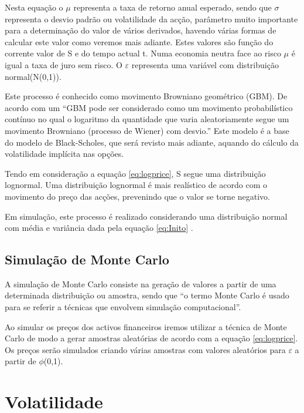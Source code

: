 \documentclass[
  12pt,
  a4paper,
  openany]{book}
\begin{document}
Nesta equação o \(\mu\) representa a taxa de retorno anual esperado, sendo que \(\sigma\) representa o desvio padrão ou volatilidade da acção, parâmetro muito importante para a determinação do valor de vários derivados, havendo várias formas de calcular este valor como veremos mais adiante. Estes valores são função do corrente valor de S e do tempo actual t. Numa economia neutra face ao risco \(\mu\) é igual a taxa de juro sem risco. O \(\varepsilon\) representa uma variável com distribuição normal(N(0,1)).

Este processo é conhecido como movimento Browniano geométrico (GBM). De acordo com \citet{AppliedFinancial} um ``GBM pode ser considerado como um movimento probabilístico contínuo no qual o logaritmo da quantidade que varia aleatoriamente segue um movimento Browniano (processo de Wiener) com desvio.'' Este modelo é a base do modelo de Black-Scholes, que será revisto mais adiante, aquando do cálculo da volatilidade implícita nas opções.

Tendo em consideração a equação \eqref{eq:logprice}, S segue uma distribuição lognormal. Uma distribuição lognormal é mais realístico de acordo com o movimento do preço das acções, prevenindo que o valor se torne negativo.

Em simulação, este processo é realizado considerando uma distribuição normal com média e variância dada pela equação \eqref{eq:Inito} \citep{FRM1}.

\hypertarget{simulauxe7uxe3o-de-monte-carlo}{%
\subsection{Simulação de Monte Carlo}\label{simulauxe7uxe3o-de-monte-carlo}}

A simulação de Monte Carlo consiste na geração de valores a partir de uma determinada distribuição ou amostra, sendo que ``o termo Monte Carlo é usado para se referir a técnicas que envolvem simulação computacional''\citep[pp.457]{ProgSim}.

Ao simular os preços dos activos financeiros iremos utilizar a técnica de Monte Carlo de modo a gerar amostras aleatórias de acordo com a equação \eqref{eq:logprice}. Os preços serão simulados criando várias amostras com valores aleatórios para \(\varepsilon\) a partir de \(\phi\)(0,1).

\hypertarget{volatilidade}{%
\section{Volatilidade}\label{volatilidade}}
\end{document}
